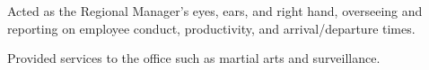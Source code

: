 \begin{achievements}
	\item Acted as the Regional Manager's eyes, ears, and right hand, overseeing and reporting on employee conduct, productivity, and arrival/departure times.
	\item Provided services to the office such as martial arts and surveillance.
\end{achievements}
